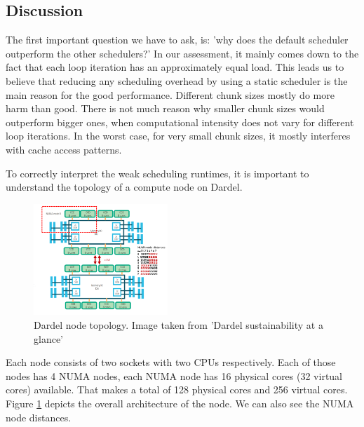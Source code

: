 \documentclass[a4paper,10pt]{article}
\begin{document}
\begin{multicols}{2}
\subsection{Discussion}
The first important question we have to ask, is: 'why does the default scheduler outperform the other schedulers?'
In our assessment, it mainly comes down to the fact that each loop iteration has an approximately equal load.
This leads us to believe that reducing any scheduling overhead by using a static scheduler is the main reason for the good performance.
Different chunk sizes mostly do more harm than good.
There is not much reason why smaller chunk sizes would outperform bigger ones, when computational intensity does not vary for different loop iterations.
In the worst case, for very small chunk sizes, it mostly interferes with cache access patterns.

To correctly interpret the weak scheduling runtimes, it is important to understand the topology of a compute node on Dardel.
\begin{figure}[H]
     \centering
     \includegraphics[width=0.45\textwidth]{../images/2_openmp/node_topology.png}
     \caption{Dardel node topology. Image taken from 'Dardel sustainability at a glance'\cite{Barth2023}}
     \label{fig:dardel_topo}
\end{figure}
Each node consists of two sockets with two CPUs respectively.
Each of those nodes has 4 NUMA nodes, each NUMA node has 16 physical cores (32 virtual cores) available.
That makes a total of 128 physical cores and 256 virtual cores.
Figure \ref{fig:dardel_topo} depicts the overall architecture of the node.
We can also see the NUMA node distances.


\end{multicols}
\end{document}
